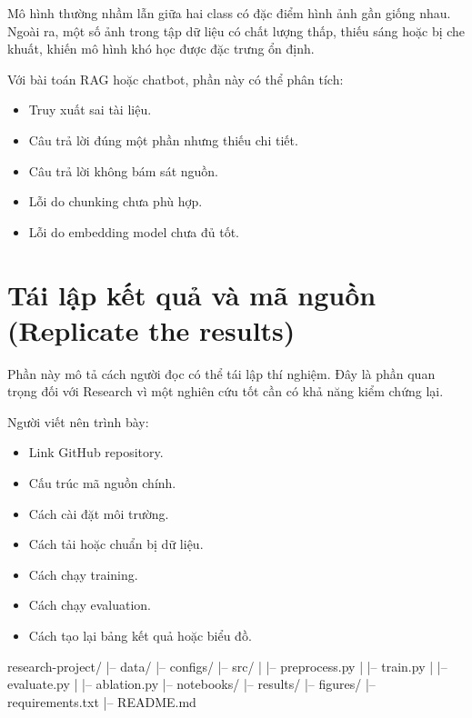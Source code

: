 \documentclass[12pt]{ai_conquer2026}
\begin{document}
\begin{aivncodebox}[Ví dụ:]
Mô hình thường nhầm lẫn giữa hai class có đặc điểm hình ảnh gần giống nhau. Ngoài ra, một số ảnh trong tập dữ liệu có chất lượng thấp, thiếu sáng hoặc bị che khuất, khiến mô hình khó học được đặc trưng ổn định.
\end{aivncodebox}

\begin{aivncodebox}[Ví dụ:]
Với bài toán RAG hoặc chatbot, phần này có thể phân tích:

\begin{itemize}
\item Truy xuất sai tài liệu.
\item Câu trả lời đúng một phần nhưng thiếu chi tiết.
\item Câu trả lời không bám sát nguồn.
\item Lỗi do chunking chưa phù hợp.
\item Lỗi do embedding model chưa đủ tốt.
\end{itemize}
\end{aivncodebox}

\section{Tái lập kết quả và mã nguồn (Replicate the results)}

Phần này mô tả cách người đọc có thể tái lập thí nghiệm. Đây là phần quan trọng đối với Research vì một nghiên cứu tốt cần có khả năng kiểm chứng lại.

Người viết nên trình bày:

\begin{itemize}
\item Link GitHub repository.
\item Cấu trúc mã nguồn chính.
\item Cách cài đặt môi trường.
\item Cách tải hoặc chuẩn bị dữ liệu.
\item Cách chạy training.
\item Cách chạy evaluation.
\item Cách tạo lại bảng kết quả hoặc biểu đồ.
\end{itemize}



\begin{aivnoutputbox}
research-project/
|-- data/
|-- configs/
|-- src/
|   |-- preprocess.py
|   |-- train.py
|   |-- evaluate.py
|   |-- ablation.py
|-- notebooks/
|-- results/
|-- figures/
|-- requirements.txt
|-- README.md
\end{aivnoutputbox}
\end{document}
